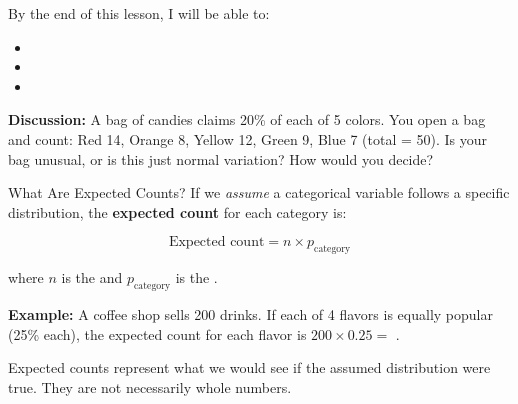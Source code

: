 \documentclass[10pt]{article}
\begin{document}
\namedateperiod

\begin{objectivebox}
By the end of this lesson, I will be able to:
\begin{itemize}
    \item[$\square$] \writeline
    \item[$\square$] \writeline
    \item[$\square$] \writeline
\end{itemize}
\end{objectivebox}

\begin{vocabbox}
\end{vocabbox}

\begin{hookbox}
\textbf{Discussion:} A bag of candies claims 20\% of each of 5 colors. You open a bag
and count: Red 14, Orange 8, Yellow 12, Green 9, Blue 7 (total = 50). Is your bag unusual,
or is this just normal variation? How would you decide?

\end{hookbox}

\begin{notesbox}{What Are Expected Counts?}
If we \emph{assume} a categorical variable follows a specific distribution, the
\textbf{expected count} for each category is:

\[
    \text{Expected count} = n \times p_{\text{category}}
\]

where $n$ is the \blank{3cm} and $p_{\text{category}}$ is the \blank{5cm}.

\vspace{0.1in}
\textbf{Example:} A coffee shop sells 200 drinks. If each of 4 flavors is equally popular
(25\% each), the expected count for each flavor is $200 \times 0.25 = $ \blank{2cm}.

\vspace{0.1in}
Expected counts represent what we would see \blank{6cm}
if the assumed distribution were true. They are not necessarily whole numbers.
\end{notesbox}
\end{document}
